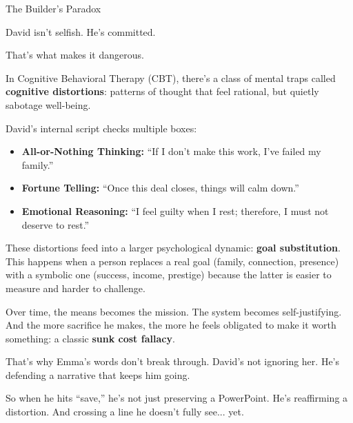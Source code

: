 \begin{PsychologicalSidebar}{The Builder’s Paradox}

  David isn’t selfish. He’s committed.

  \medskip
  
  That’s what makes it dangerous.
  
  \medskip
  
  In Cognitive Behavioral Therapy (CBT), there’s a class of mental traps called \textbf{cognitive distortions}: 
  patterns of thought that feel rational, but quietly sabotage well-being.

  \medskip
  
  David’s internal script checks multiple boxes:

  \medskip
  
  \begin{itemize}
    \item \textbf{All-or-Nothing Thinking:} “If I don’t make this work, I’ve failed my family.”
    \item \textbf{Fortune Telling:} “Once this deal closes, things will calm down.”
    \item \textbf{Emotional Reasoning:} “I feel guilty when I rest; therefore, I must not deserve to rest.”
  \end{itemize}
  
  \medskip
  
  These distortions feed into a larger psychological dynamic:  
  \textbf{goal substitution}. This happens when a person replaces a real goal (family, connection, presence) 
  with a symbolic one (success, income, prestige) because the latter is easier to measure and harder to challenge.

  \medskip
  
  Over time, the means becomes the mission.  
  The system becomes self-justifying.  
  And the more sacrifice he makes, the more he feels obligated to make it worth something: a classic \textbf{sunk cost fallacy}.
  
  \medskip
  
  That’s why Emma’s words don’t break through.  
  David’s not ignoring her. He’s defending a narrative that keeps him going.
  
  \medskip
  
  So when he hits “save,” he’s not just preserving a PowerPoint.
  He’s reaffirming a distortion.  
  And crossing a line he doesn’t fully see... yet.
  
\end{PsychologicalSidebar}

